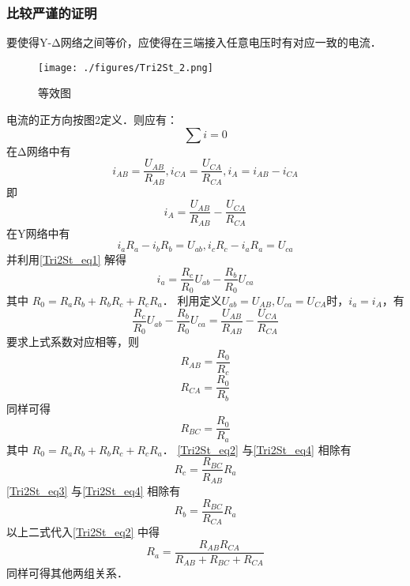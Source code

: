 \subsubsection{比较严谨的证明}
要使得Y-Δ网络之间等价，应使得在三端接入任意电压时有对应一致的电流．
\begin{figure}[ht]
\centering
\texttt{[image: ./figures/Tri2St\_2.png]}
\caption{等效图} \label{Tri2St_fig2}
\end{figure}
电流的正方向按图2定义．则应有：
\begin{equation}\label{Tri2St_eq1}
\sum{i}=0
\end{equation}
在Δ网络中有
\begin{equation}
i_{AB}=\frac{U_{AB}}{R_{AB}},i_{CA}=\frac{U_{CA}}{R_{CA}},i_A=i_{AB}-i_{CA}
\end{equation}
即
\begin{equation}
i_A=\frac{U_{AB}}{R_{AB}}-\frac{U_{CA}}{R_{CA}}
\end{equation}
在Y网络中有
\begin{equation}
i_a R_a-i_b R_b=U_{ab},i_c R_c-i_a R_a=U_{ca}
\end{equation}
并利用\autoref{Tri2St_eq1} 解得
\begin{equation}
i_a=\frac{R_c}{R_0}U_{ab}-\frac{R_b}{R_0}U_{ca}
\end{equation}
其中 $R_0 = R_a R_b + R_b R_c + R_c R_a$．
利用定义$U_{ab}=U_{AB},U_{ca}=U_{CA}$时，$i_a=i_A$，有
\begin{equation}
\frac{R_c}{R_0}U_{ab}-\frac{R_b}{R_0}U_{ca}=\frac{U_{AB}}{R_{AB}}-\frac{U_{CA}}{R_{CA}}
\end{equation}
要求上式系数对应相等，则
\begin{equation}\label{Tri2St_eq2}
R_{AB}=\frac{R_0}{R_c}
\end{equation}
\begin{equation}\label{Tri2St_eq3}
R_{CA}=\frac{R_0}{R_b}
\end{equation}
同样可得
\begin{equation}\label{Tri2St_eq4}
R_{BC}=\frac{R_0}{R_a}
\end{equation}
其中 $R_0 = R_a R_b + R_b R_c + R_c R_a$．
\autoref{Tri2St_eq2} 与\autoref{Tri2St_eq4} 相除有
\begin{equation}
R_c=\frac{R_{BC}}{R_{AB}}R_a
\end{equation}
\autoref{Tri2St_eq3} 与\autoref{Tri2St_eq4} 相除有
\begin{equation}
R_b=\frac{R_{BC}}{R_{CA}}R_a
\end{equation}
以上二式代入\autoref{Tri2St_eq2} 中得
\begin{equation}
R_a=\frac{R_{AB} R_{CA}}{R_{AB}+R_{BC}+R_{CA}}
\end{equation}
同样可得其他两组关系．
